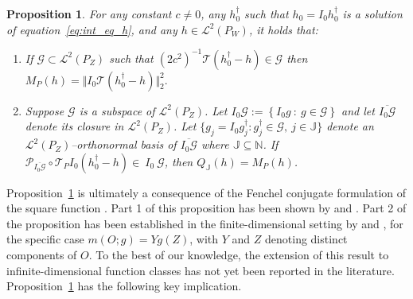 \documentclass[twoside,11pt]{article}
\newtheorem{proposition}{Proposition}
\newcommand{\mc}{\mathcal}
\begin{document}
\begin{proposition}
   For any constant $c \ne0$, any $h_0^\dag$ such that  $h_0=I_0h_0^\dag$ is a solution of equation~\eqref{eq:int_eq_h}, and any $h\in \mc{L}^2(P_{W})$, it holds that:
    \begin{enumerate}
    \item 
    If $\mc{G}\subset\mc{L}^2(P_Z)$ such that $(2c^2)^{-1}\mc{T}(h_0^\dag-h)\in\mc{G}$ then $ 
         M_P(h) =\Vert I_0\mc{T}(h_0^\dag-h)\Vert_2^2.\label{eq:mph} $ 
    \item 
    Suppose $\mc{G}$ is a subspace of $\mc{L}^2(P_{Z})$. Let $I_0\mc{G}:=\left\{I_0g\::\:g\in\mc{G}\right\}$ and let $\overline{I_0\mc{G}}$ denote its closure in $\mc{L}^2(P_Z)$. Let $\{g_j=I_0g_j^\dag:g_j^\dag \in \mc{G},\:j\in\mathbb{J}\}$ denote an $\mc{L}^2(P_Z)$--orthonormal basis of $\overline{I_0\mc{G}}$ where $\mathbb{J}\subseteq\mathbb{N}$. If  $\mc{P}_{\overline{I_0\mc{G}}}\circ\mc{T}_{P}I_0(h_0^\dag-h)\in\ I_0\:\mc{G}$, then $ 
    Q_{\mathbb{J}}(h)=M_P(h)$. 
    \end{enumerate}
    \label{prop:innermax}
\end{proposition}
Proposition~\ref{prop:innermax} is ultimately a consequence of the Fenchel conjugate formulation of the square function \citep{borwein2006convex}. Part 1 of this proposition has been shown by \cite{dikkala2020minimax} and \cite{kallus2021causal}. Part 2 of the proposition has been established in the finite-dimensional setting by \cite{bennett2019deep} and \cite{muandet2020dual}, for the specific case $m(O; g) = Y g(Z)$, with $Y$ and $Z$ denoting distinct components of $O$. To the best of our knowledge, the extension of this result to infinite-dimensional function classes has not yet been reported in the literature. Proposition~\ref{prop:innermax} has the following key implication.
\end{document}
